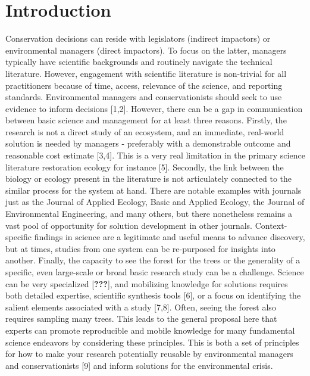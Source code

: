 \documentclass[10pt,letterpaper]{article}
\begin{document}
\linenumbers

\section{Introduction}\label{introduction}

Conservation decisions can reside with legislators (indirect impactors)
or environmental managers (direct impactors). To focus on the latter,
managers typically have scientific backgrounds and routinely navigate
the technical literature. However, engagement with scientific literature
is non-trivial for all practitioners because of time, access, relevance
of the science, and reporting standards. Environmental managers and
conservationists should seek to use evidence to inform decisions
{[}1,2{]}. However, there can be a gap in communication between basic
science and management for at least three reasons. Firstly, the research
is not a direct study of an ecosystem, and an immediate, real-world
solution is needed by managers - preferably with a demonstrable outcome
and reasonable cost estimate {[}3,4{]}. This is a very real limitation
in the primary science literature restoration ecology for instance
{[}5{]}. Secondly, the link between the biology or ecology present in
the literature is not articulately connected to the similar process for
the system at hand. There are notable examples with journals just as the
Journal of Applied Ecology, Basic and Applied Ecology, the Journal of
Environmental Engineering, and many others, but there nonetheless
remains a vast pool of opportunity for solution development in other
journals. Context-specific findings in science are a legitimate and
useful means to advance discovery, but at times, studies from one system
can be re-purposed for insights into another. Finally, the capacity to
see the forest for the trees or the generality of a specific, even
large-scale or broad basic research study can be a challenge. Science
can be very specialized {[}{\textbf{???}}{]}, and mobilizing knowledge
for solutions requires both detailed expertise, scientific synthesis
tools {[}6{]}, or a focus on identifying the salient elements associated
with a study {[}7,8{]}. Often, seeing the forest also requires sampling
many trees. This leads to the general proposal here that experts can
promote reproducible and mobile knowledge for many fundamental science
endeavors by considering these principles. This is both a set of
principles for how to make your research potentially reusable by
environmental managers and conservationists {[}9{]} and inform solutions
for the environmental crisis.
\end{document}

